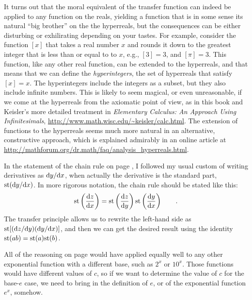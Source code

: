 It turns out that the moral equivalent of the  transfer function can indeed be applied to any function on
the reals, yielding a function that is in some sense its natural ``big brother'' on the the hyperreals, but the consequences can be
either disturbing or exhilirating depending on your tastes.
 For example, consider the function $[x]$ that takes
a real number $x$ and rounds it down to the greatest integer that is less than or equal to to $x$, e.g.,
$[3]=3$, and $[\pi]=3$. This function, like any other real function,
can be extended to the hyperreals, and that means that we can define
the \emph{hyperintegers},
the set of hyperreals that satisfy $[x]=x$. The hyperintegers include the integers as a subset,
but they also include infinite numbers. This is likely to seem magical, or even unreasonable, if we come
at the hyperreals from the axiomatic point of view,
as in this book and Keisler's more detailed treatment in
\emph{Elementary Calculus: An Approach Using Infinitesimals}, \url{http://www.math.wisc.edu/~keisler/calc.html}.
The extension of functions to the hyperreals seems much more natural in an alternative,
constructive approach, which is explained admirably in an online article at \url{http://mathforum.org/dr.math/faq/analysis_hyperreals.html}.


In the statement of the chain rule on page \pageref{sec:chain-rule}, I followed my usual custom of writing
derivatives as $\textup{d} y/\textup{d} x$, when actually the derivative is the standard part, $\text{st}(\textup{d} y/\textup{d} x)$. In more rigorous
notation, the chain rule should be stated like this:
\begin{equation*}
  \text{st}\left(\frac{\textup{d} z}{\textup{d} x}\right) =   \text{st}\left(\frac{\textup{d} z}{\textup{d} y}\right) \text{st}\left(\frac{\textup{d} y}{\textup{d} x}\right) \qquad .
\end{equation*}
The transfer principle allows us to rewrite the left-hand side as $\text{st}[(\textup{d} z/\textup{d} y)(\textup{d} y/\textup{d} x)]$, and then
we can get the desired result using the identity $\text{st}(ab)=\text{st}(a)\text{st}(b)$.


All of the reasoning on page \pageref{main:exp} would have applied equally well to any other
exponential function with a different base, such as $2^x$ or $10^x$. Those functions would have
different values of $c$, so if we want to determine the value of $c$ for the base-$e$ case, we
need to bring in the definition of $e$, or of the exponential function $e^x$, somehow.

